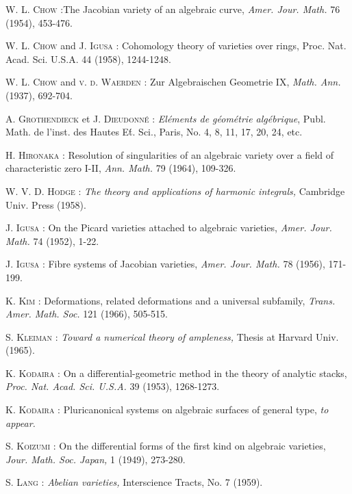 \begin{thebibliography}{99}
 \textsc{W. L. Chow :}\pageoriginale The Jacobian variety of an algebraic curve, {\em Amer. Jour. Math.} 76 (1954), 453-476.

 \textsc{W. L. Chow} and \textsc{J. Igusa :} Cohomology theory of varieties over rings, {\rm Proc. Nat. Acad. Sci. U.S.A.} 44 (1958), 1244-1248.

 \textsc{W. L. Chow} and \textsc{v. d. Waerden :} Zur Algebraischen Geometrie IX, {\em Math. Ann.} (1937), 692-704.

 \textsc{A. Grothendieck} et \textsc{J. Dieudonn\'e :} {\em El\'ements de g\'eom\'etrie alg\'ebrique}, Publ. Math. de l'inst. des Hautes E\'t. Sci., Paris, No. 4, 8, 11, 17, 20, 24, etc.

 \textsc{H. Hironaka :} Resolution of singularities of an algebraic variety over a field of characteristic zero I-II, {\em Ann. Math.} 79 (1964), 109-326.

 \textsc{W. V. D. Hodge :} {\em The theory and applications of harmonic integrals,} Cambridge Univ. Press (1958).

 \textsc{J. Igusa :} On the Picard varieties attached to algebraic varieties, {\em Amer. Jour. Math.} 74 (1952), 1-22.

 \textsc{J. Igusa :} Fibre systems of Jacobian varieties, {\em Amer. Jour. Math.} 78 (1956), 171-199.

 \textsc{K. Kim :} Deformations, related deformations and a universal subfamily, {\em Trans. Amer. Math. Soc.} 121 (1966), 505-515.

 \textsc{S. Kleiman :} {\em Toward a numerical theory of ampleness,} Thesis at Harvard Univ. (1965).

 \textsc{K. Kodaira :} On a differential-geometric method in the theory of analytic stacks, {\em Proc. Nat. Acad. Sci. U.S.A.} 39 (1953), 1268-1273.

 \textsc{K. Kodaira :} Pluricanonical systems on algebraic surfaces of general type, {\em to appear.}

 \textsc{S. Koizumi :} On the differential forms of the first kind on algebraic varieties, {\em Jour. Math. Soc. Japan,} 1 (1949), 273-280.

 \textsc{S. Lang :} {\em Abelian varieties,} Interscience Tracts, No. 7 (1959).


\end{thebibliography}
